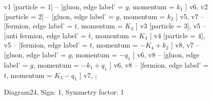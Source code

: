 \documentclass{revtex4}
\begin{document}
\begin{figure}[!htb]
\begin{center}
{    %
v1 [particle = \(1\)] -- [gluon, edge label' = \(g\), momentum = \(k_{1}\) ] v6, 
v2 [particle = \(2\)] -- [gluon, edge label' = \(g\), momentum = \(k_{2}\) ] v5, 
v7 -- [fermion, edge label' = \(t\), momentum = \(K_{3}\) ] v3 [particle = \(3\)], 
v5 -- [anti fermion, edge label' = \(\overline{t}\), momentum = \(K_{4}\) ] v4 [particle = \(4\)], 
v5 -- [fermion, edge label' = \(t\), momentum = \(-K_{4} + k_{2}\) ] v8, 
v7 -- [gluon, edge label' = \(g\), momentum = \(-q_{1}\) ] v6, 
v8 -- [gluon, edge label' = \(g\), momentum = \(-k_{1} + q_{1}\) ] v6, 
v8 -- [fermion, edge label' = \(t\), momentum = \(K_{3} - q_{1}\) ] v7, 
};
\end{center}
\caption{Diagram24, Sign: 1, Symmetry factor: 1}
\end{figure}
\newpage
\end{document}
